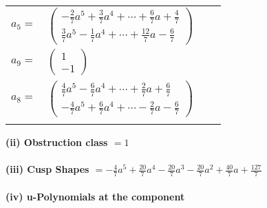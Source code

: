 \documentclass[1p]{elsarticle_modified}
\theoremstyle{definition}
\begin{document}
\begin{tabular}{m{7pt} m{180pt} m{7pt} m{180pt} }
\flushright $a_{5}=$&$\begin{pmatrix}-\frac{2}{7} a^5+\frac{3}{7} a^4+\cdots+\frac{6}{7} a+\frac{4}{7}\\\frac{3}{7} a^5-\frac{1}{7} a^4+\cdots+\frac{12}{7} a-\frac{6}{7}\end{pmatrix}$ \\
\flushright $a_{9}=$&$\begin{pmatrix}1\\-1\end{pmatrix}$ \\
\flushright $a_{8}=$&$\begin{pmatrix}\frac{4}{7} a^5-\frac{6}{7} a^4+\cdots+\frac{2}{7} a+\frac{6}{7}\\-\frac{4}{7} a^5+\frac{6}{7} a^4+\cdots-\frac{2}{7} a-\frac{6}{7}\end{pmatrix}$\\&\end{tabular}
\flushleft \textbf{(ii) Obstruction class $= 1$}\\~\\
\flushleft \textbf{(iii) Cusp Shapes $= -\frac{4}{7} a^5+\frac{20}{7} a^4-\frac{20}{7} a^3-\frac{20}{7} a^2+\frac{40}{7} a+\frac{127}{7}$}\\~\\
\newpage\renewcommand{\arraystretch}{1}
\flushleft \textbf{(iv) u-Polynomials at the component}\newline \\
\end{document}
